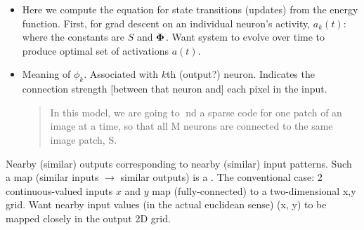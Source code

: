 \documentclass[12pt]{article}
\begin{document}
\begin{itemize}
	\item Here we compute the equation for state transitions (updates) from the energy function. First, for grad descent on an individual neuron's activity, $a_k(t)$:
	where the constants are $S$ and $\bm{\Phi}_{}$. Want system to evolve over time to produce optimal set of activations $a(t)$. 
	
	\item Meaning of $\phi_k$. Associated with $k$th (output?) neuron. Indicates the connection strength [between that neuron and] each pixel in the input. 
	
	\begin{quote}
		In this model, we are going to nd a sparse code for one patch of an image
		at a time, so that all M neurons are connected to the same image patch, S.
	\end{quote}
\end{itemize}



\p Nearby (similar) outputs corresponding to nearby (similar) input patterns. Such a map (similar inputs $\rightarrow$ similar outputs) is a . The conventional case: 2 continuous-valued inputs $x$ and $y$ map (fully-connected) to a two-dimensional x,y grid. Want nearby input values (in the actual euclidean sense) (x, y) to be mapped closely in the output 2D grid. \\
\end{document}
